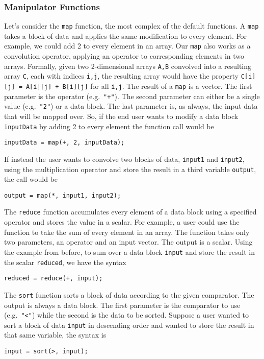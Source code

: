\documentclass[twocolumn]{article}
\renewcommand{\|}{\origbar} %
\newcommand{\code}[1]{\texttt{#1}}
\begin{document}
\subsubsection{Manipulator Functions}

Let's consider the \code{map} function, the most complex of the default functions. A \code{map} takes a block of data and applies the same modification to every element. For example, we could add 2 to every element in an array. Our \code{map} also works as a convolution operator, applying an operator to corresponding elements in two arrays. Formally, given two 2-dimensional arrays \code{A,B} convolved into a resulting array \code{C}, each with indices \code{i,j}, the resulting array would have the property \code{C[i][j]~=~A[i][j]~+~B[i][j]} for all \code{i,j}. The result of a \code{map} is a vector. The first parameter is the operator (e.g.\ \code{"+"}). The second parameter can either be a single value (e.g.\ \code{"2"}) or a data block. The last parameter is, as always, the input data that will be mapped over. So, if the end user wants to modify a data block \code{inputData} by adding 2 to every element the function call would be
\begin{center}
  \code{inputData = map(+, 2, inputData);}
\end{center}
If instead the user wants to convolve two blocks of data, \code{input1} and \code{input2}, using the multiplication operator and store the result in a third variable \code{output}, the call would be
\begin{center}
  \code{output = map(*, input1, input2);}
\end{center}

The \code{reduce} function accumulates every element of a data block using a specified operator and stores the value in a scalar. For example, a user could use the function to take the sum of every element in an array. The function takes only two parameters, an operator and an input vector. The output is a scalar. Using the example from before, to sum over a data block \code{input} and store the result in the scalar \code{reduced}, we have the syntax
\begin{center}
  \code{reduced = reduce(+, input);}
\end{center}

The \code{sort} function sorts a block of data according to the given comparator. The output is always a data block. The first parameter is the comparator to use (e.g.\ \code{"<"}) while the second is the data to be sorted. Suppose a user wanted to sort a block of data \code{input} in descending order and wanted to store the result in that same variable, the syntax is
\begin{center}
  \code{input = sort(>, input);}
\end{center}
\end{document}
